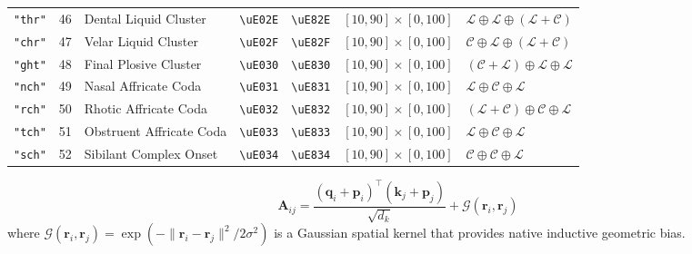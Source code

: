 \documentclass[11pt,oneside,letterpaper]{article}
\theoremstyle{definition}
\begin{document}
\begin{table}[b]
\begin{tabularx}{\textwidth}{cc>{\raggedright\arraybackslash}Xcc>{\raggedright\arraybackslash}p{3.2cm}>{\raggedright\arraybackslash}X}
\texttt{"thr"}  & 46 & Dental Liquid Cluster      & \texttt{\textbackslash uE02E} & \texttt{\textbackslash uE82E} & $[10, 90] \times [0, 100]$ & $\mathcal{L} \oplus \mathcal{L} \oplus (\mathcal{L}+\mathcal{C})$ \\
\texttt{"chr"}  & 47 & Velar Liquid Cluster       & \texttt{\textbackslash uE02F} & \texttt{\textbackslash uE82F} & $[10, 90] \times [0, 100]$ & $\mathcal{C} \oplus \mathcal{L} \oplus (\mathcal{L}+\mathcal{C})$ \\
\texttt{"ght"}  & 48 & Final Plosive Cluster      & \texttt{\textbackslash uE030} & \texttt{\textbackslash uE830} & $[10, 90] \times [0, 100]$ & $(\mathcal{C}+\mathcal{L}) \oplus \mathcal{L} \oplus \mathcal{L}$ \\
\texttt{"nch"}  & 49 & Nasal Affricate Coda       & \texttt{\textbackslash uE031} & \texttt{\textbackslash uE831} & $[10, 90] \times [0, 100]$ & $\mathcal{L} \oplus \mathcal{C} \oplus \mathcal{L}$ \\
\texttt{"rch"}  & 50 & Rhotic Affricate Coda      & \texttt{\textbackslash uE032} & \texttt{\textbackslash uE832} & $[10, 90] \times [0, 100]$ & $(\mathcal{L}+\mathcal{C}) \oplus \mathcal{C} \oplus \mathcal{L}$ \\
\texttt{"tch"}  & 51 & Obstruent Affricate Coda   & \texttt{\textbackslash uE033} & \texttt{\textbackslash uE833} & $[10, 90] \times [0, 100]$ & $\mathcal{L} \oplus \mathcal{C} \oplus \mathcal{L}$ \\
\texttt{"sch"}  & 52 & Sibilant Complex Onset     & \texttt{\textbackslash uE034} & \texttt{\textbackslash uE834} & $[10, 90] \times [0, 100]$ & $\mathcal{C} \oplus \mathcal{C} \oplus \mathcal{L}$ \\
\bottomrule
\end{tabularx}
\end{table}

\begin{equation}
\mathbf{A}_{ij} = \frac{(\mathbf{q}_i + \mathbf{p}_i)^\top (\mathbf{k}_j + \mathbf{p}_j)}{\sqrt{d_k}} + \mathcal{G}(\mathbf{r}_i, \mathbf{r}_j)
\end{equation}
where $\mathcal{G}(\mathbf{r}_i, \mathbf{r}_j) = \exp(-\|\mathbf{r}_i - \mathbf{r}_j\|^2 / 2\sigma^2)$ is a Gaussian spatial kernel that provides native inductive geometric bias.
\end{document}
